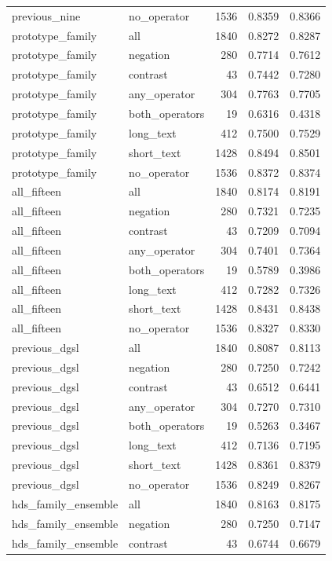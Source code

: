 \begin{tabular}{llrrr}
previous\_nine & no\_operator & 1536 & 0.8359 & 0.8366 \\
prototype\_family & all & 1840 & 0.8272 & 0.8287 \\
prototype\_family & negation & 280 & 0.7714 & 0.7612 \\
prototype\_family & contrast & 43 & 0.7442 & 0.7280 \\
prototype\_family & any\_operator & 304 & 0.7763 & 0.7705 \\
prototype\_family & both\_operators & 19 & 0.6316 & 0.4318 \\
prototype\_family & long\_text & 412 & 0.7500 & 0.7529 \\
prototype\_family & short\_text & 1428 & 0.8494 & 0.8501 \\
prototype\_family & no\_operator & 1536 & 0.8372 & 0.8374 \\
all\_fifteen & all & 1840 & 0.8174 & 0.8191 \\
all\_fifteen & negation & 280 & 0.7321 & 0.7235 \\
all\_fifteen & contrast & 43 & 0.7209 & 0.7094 \\
all\_fifteen & any\_operator & 304 & 0.7401 & 0.7364 \\
all\_fifteen & both\_operators & 19 & 0.5789 & 0.3986 \\
all\_fifteen & long\_text & 412 & 0.7282 & 0.7326 \\
all\_fifteen & short\_text & 1428 & 0.8431 & 0.8438 \\
all\_fifteen & no\_operator & 1536 & 0.8327 & 0.8330 \\
previous\_dgsl & all & 1840 & 0.8087 & 0.8113 \\
previous\_dgsl & negation & 280 & 0.7250 & 0.7242 \\
previous\_dgsl & contrast & 43 & 0.6512 & 0.6441 \\
previous\_dgsl & any\_operator & 304 & 0.7270 & 0.7310 \\
previous\_dgsl & both\_operators & 19 & 0.5263 & 0.3467 \\
previous\_dgsl & long\_text & 412 & 0.7136 & 0.7195 \\
previous\_dgsl & short\_text & 1428 & 0.8361 & 0.8379 \\
previous\_dgsl & no\_operator & 1536 & 0.8249 & 0.8267 \\
hds\_family\_ensemble & all & 1840 & 0.8163 & 0.8175 \\
hds\_family\_ensemble & negation & 280 & 0.7250 & 0.7147 \\
hds\_family\_ensemble & contrast & 43 & 0.6744 & 0.6679 \\

\end{tabular}
